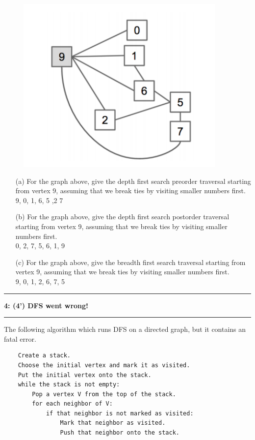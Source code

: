\documentclass[10.5pt]{article}
\newcommand\question[2]{\vspace{.25in}\hrule\textbf{#1: #2}\vspace{.5em}\hrule\vspace{.10in}}
\begin{document}
\begin{figure}[htbp]
	\centering
	\includegraphics{graph_traversal.png}
	\label{fig:my_label}
\end{figure}
\begin{itemize}
	\item[(a)] For the graph above, give the depth first search preorder traversal starting from vertex 9, assuming that we break ties by visiting smaller numbers first.\\
	      9, 0, 1, 6, 5 ,2 7
	\item[(b)] For the graph above, give the depth first search postorder traversal starting from vertex 9, assuming that we break ties by visiting smaller numbers first.\\
	      0, 2, 7, 5, 6, 1, 9
	\item[(c)] For the graph above, give the breadth first search traversal starting from vertex 9, assuming that we break ties by visiting smaller numbers first.\\
	      9, 0, 1, 2, 6, 7, 5
\end{itemize}

\pagebreak
\question{4}{(4') DFS went wrong!}
The following algorithm which runs DFS on a directed graph, but it contains an fatal error.
\begin{lstlisting}
    Create a stack.
    Choose the initial vertex and mark it as visited.
    Put the initial vertex onto the stack.
    while the stack is not empty:
        Pop a vertex V from the top of the stack.
        for each neighbor of V:
            if that neighbor is not marked as visited:
                Mark that neighbor as visited.
                Push that neighbor onto the stack.
\end{lstlisting}
\end{document}
